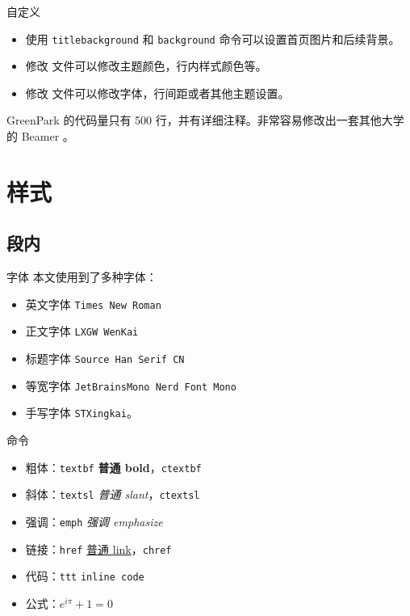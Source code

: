 \documentclass{ctexbeamer}
\begin{document}
\begin{frame}{自定义}
  \begin{itemize}
  \item 使用 \texttt{titlebackground} 和 \texttt{background}  命令可以设置首页图片和后续背景。
  \item 修改  文件可以修改主题颜色，行内样式颜色等。
  \item 修改  文件可以修改字体，行间距或者其他主题设置。
  \end{itemize}

  GreenPark 的代码量只有 500 行，并有详细注释。非常容易修改出一套其他大学的 Beamer 。
  
\end{frame}

\section{样式}
\subsection{段内}
\begin{frame}{字体}
  本文使用到了多种字体：
  \begin{itemize}
  \item 英文字体 \texttt{Times New Roman}
  \item 正文字体 \texttt{LXGW WenKai}
  \item 标题字体 \texttt{Source Han Serif CN}
  \item 等宽字体 \texttt{JetBrainsMono Nerd Font Mono}
  \item 手写字体 \texttt{STXingkai}。
  \end{itemize}
\end{frame}

\begin{frame}{命令}
  \begin{itemize}
  \item 粗体：\texttt{textbf} \textbf{普通 bold}，\texttt{ctextbf} 
  \item 斜体：\texttt{textsl} \textsl{普通 slant}，\texttt{ctextsl} 
  \item 强调：\texttt{emph} \emph{强调 emphasize}
  \item 链接：\texttt{href} \href{https://thysrael.github.io/}{普通 link}，\texttt{chref} 
  \item 代码：\texttt{ttt} \texttt{inline code}
  \item 公式：\(e^{i\pi} + 1 = 0\)
  \end{itemize}
\end{frame}
\end{document}
